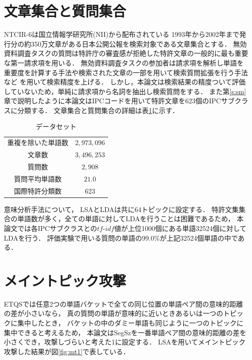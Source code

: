 \documentclass[master]{suribt}
\theoremstyle{definition}
\begin{document}
 \section{文章集合と質問集合}\label{s:ex}
 NTCIR-6は国立情報学研究所(NII)から配布されている
 1993年から2002年まで発行分の約350万文章がある日本公開公報を検索対象である文章集合とする．
 無効資料調査タスクの質問は特許庁の審査感が拒絶した特許文章の一般的に最も重要な第一請求項を用いる．
 無効資料調査タスクの参加者は請求項を解析し単語を重要度を計算する手法や検索された文章の一部を用いて検索質問拡張を行う手法など
 を用いて検索精度を上げる．
 しかし，本論文は検索結果の精度ついて評価していないため，単純に請求項から名詞を抽出し検索質問をする．
 また第\ref{s:sm}章で説明したように本論文はIPCコードを用いて特許文章を623個のIPCサブクラスに分類する．
 文章集合と質問集合の詳細は表\ref{tab:data}に示す． 

 \begin{table}[!hbp]
 \center
 \begin{tabular}{|c|c|}
 \hline
 重複を除いた単語数 & $2,973,096$  \\
 文章数 & $3,496,253$ \\
 質問数 & $2,908$ \\
 質問平均単語数 & $21.0$ \\
 国際特許分類数 & 623 \\
 \hline
 \end{tabular}
 \caption{データセット}
 \label{tab:data}
 \end{table}

 意味分析手法について，
 LSAとLDAは共に64トピックに設定する．
 特許文集集合の単語数が多く，全ての単語に対してLDAを行うことは困難であるため，
 本論文では各IPCサブクラスとの$tf\text{-}idf$値が上位1000個にある単語32524個に対してLDAを行う．
 評価実験で用いる質問の単語の$99.0\%$が上記32524個単語の中である．

 \section{メイントピック攻撃}
 ETQSでは任意2つの単語バケットで全ての同じ位置の単語ペア間の意味的距離の差が小さいなら，
 真の質問の単語が意味的に近いときあるいは一つのトピックに集中したとき，
 バケットの中のダミー単語も同じように一つのトピックに集中できると考えるため，
 本論文はSegSzを一番単語ペア間の意味的距離の差を小さくでき，攻撃しづらいと考えた1に設定する．
 LSAを用いてメイントピック攻撃した結果が図\ref{fig:mt1}で表している．
  
\end{document}
